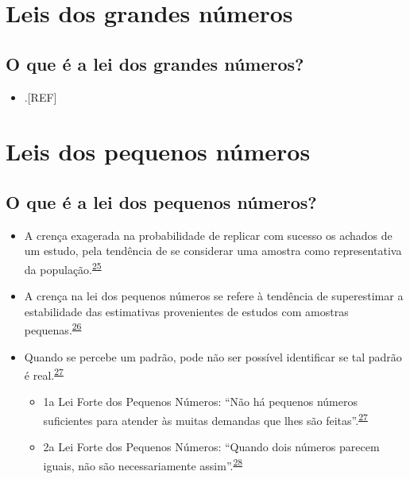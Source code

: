 \documentclass[
  a4paper,
]{book}
\providecommand{\tightlist}{%
  \setlength{\itemsep}{0pt}\setlength{\parskip}{0pt}}
\begin{document}
\hypertarget{lei-grandes-numeros}{%
\section{Leis dos grandes números}\label{lei-grandes-numeros}}

\hypertarget{o-que-uxe9-a-lei-dos-grandes-nuxfameros}{%
\subsection{O que é a lei dos grandes números?}\label{o-que-uxe9-a-lei-dos-grandes-nuxfameros}}

\begin{itemize}
\tightlist
\item
  .{[}REF{]}
\end{itemize}

\hypertarget{lei-pequenos-numeros}{%
\section{Leis dos pequenos números}\label{lei-pequenos-numeros}}

\hypertarget{o-que-uxe9-a-lei-dos-pequenos-nuxfameros}{%
\subsection{O que é a lei dos pequenos números?}\label{o-que-uxe9-a-lei-dos-pequenos-nuxfameros}}

\begin{itemize}
\item
  A crença exagerada na probabilidade de replicar com sucesso os achados de um estudo, pela tendência de se considerar uma amostra como representativa da população.\textsuperscript{\protect\hyperlink{ref-tversky1971}{25}}
\item
  A crença na lei dos pequenos números se refere à tendência de superestimar a estabilidade das estimativas provenientes de estudos com amostras pequenas.\textsuperscript{\protect\hyperlink{ref-bishop2022}{26}}
\item
  Quando se percebe um padrão, pode não ser possível identificar se tal padrão é real.\textsuperscript{\protect\hyperlink{ref-guy1988}{27}}

  \begin{itemize}
  \item
    1a Lei Forte dos Pequenos Números: ``Não há pequenos números suficientes para atender às muitas demandas que lhes são feitas''.\textsuperscript{\protect\hyperlink{ref-guy1988}{27}}
  \item
    2a Lei Forte dos Pequenos Números: ``Quando dois números parecem iguais, não são necessariamente assim''.\textsuperscript{\protect\hyperlink{ref-guy1990}{28}}
  \end{itemize}
\end{itemize}
\end{document}
